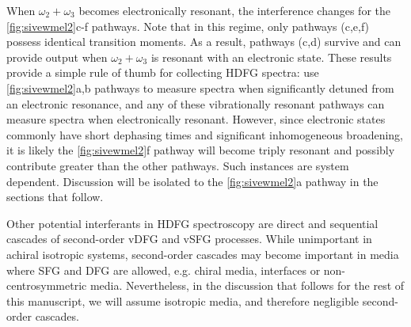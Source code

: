 \documentclass[aip, jcp, reprint, onecolumn, nofootinbib]{revtex4-2}
\begin{document}
When $\omega_2 + \omega_3$ becomes electronically resonant, the interference changes for the \autoref{fig:sivewmel2}c-f pathways.
Note that in this regime, only pathways (c,e,f) possess identical transition moments.
As a result, pathways (c,d) survive and can provide output when $\omega_2+\omega_3$ is resonant with an electronic state. 
These results provide a simple rule of thumb for collecting HDFG spectra: use \autoref{fig:sivewmel2}a,b pathways to measure spectra when significantly detuned from an electronic resonance, and any of these vibrationally resonant pathways can measure spectra when electronically resonant.
However, since electronic states commonly have short dephasing times and significant inhomogeneous broadening,\cite{Dong2015, Lewis2015} it is likely the \autoref{fig:sivewmel2}f pathway will become triply resonant and possibly contribute greater than the other pathways. 
Such instances are system dependent. 
Discussion will be isolated to the \autoref{fig:sivewmel2}a pathway in the sections that follow.

Other potential interferants in HDFG spectroscopy are direct and sequential cascades of second-order vDFG and vSFG processes.\cite{RN297, Cho2000_Cascade, RN301}
While unimportant in achiral isotropic systems,\cite{Belkin2000} second-order cascades may become important in media where SFG and DFG are allowed, e.g. chiral media, interfaces or non-centrosymmetric media. 
Nevertheless, in the discussion that follows for the rest of this manuscript, we will assume isotropic media, and therefore negligible second-order cascades. 
\end{document}
